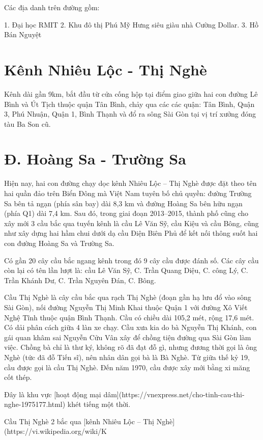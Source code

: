 Các địa danh trên đường gồm:

1. Đại học RMIT
2. Khu đô thị Phú Mỹ Hưng siêu giàu nhà Cường Dollar.
3. Hồ Bán Nguyệt

\section{Kênh Nhiêu Lộc - Thị Nghè}

Kênh dài gần 9km, bắt đầu từ cửa cống hộp tại điểm giao giữa hai con đường Lê Bình và Út Tịch thuộc quận Tân Bình, chảy qua các các quận: Tân Bình, Quận 3, Phú Nhuận, Quận 1, Bình Thạnh và đổ ra sông Sài Gòn tại vị trí xưởng đóng tàu Ba Son cũ.

\section{Đ. Hoàng Sa - Trường Sa}

Hiện nay, hai con đường chạy dọc kênh Nhiêu Lộc – Thị Nghè được đặt theo tên hai quần đảo trên Biển Đông mà Việt Nam tuyên bố chủ quyền: đường Trường Sa bên tả ngạn (phía sân bay) dài 8,3 km và đường Hoàng Sa bên hữu ngạn (phía Q1) dài 7,4 km. Sau đó, trong giai đoạn 2013–2015, thành phố cũng cho xây mới 3 cầu bắc qua tuyến kênh là cầu Lê Văn Sỹ, cầu Kiệu và cầu Bông, cũng như xây dựng hai hầm chui dưới dạ cầu Điện Biên Phủ để kết nối thông suốt hai con đường Hoàng Sa và Trường Sa.

Có gần 20 cây cầu bắc ngang kênh trong đó 9 cây cầu được đánh số. Các cây cầu còn lại có tên lần lượt là: cầu Lê Văn Sỹ, C. Trần Quang Diệu, C. công Lý, C. Trần Khánh Dư, C. Trần Nguyên Đán, C. Bông.

Cầu Thị Nghè là cây cầu bắc qua rạch Thị Nghè (đoạn gần hạ lưu đổ vào sông Sài Gòn), nối đường Nguyễn Thị Minh Khai thuộc Quận 1 với đường Xô Viết Nghệ Tĩnh thuộc quận Bình Thạnh. Cầu có chiều dài 105,2 mét, rộng 17,6 mét. Có dải phân cách giữa 4 làn xe chạy. Cầu xưa kia do bà Nguyễn Thị Khánh, con gái quan khâm sai Nguyễn Cửu Vân xây để chồng tiện đường qua Sài Gòn làm việc. Chồng bà chỉ là thư ký, không rõ đã đạt đỗ gì, nhưng đương thời gọi là ông Nghè (tức đã đỗ Tiến sĩ), nên nhân dân gọi bà là Bà Nghè. Từ giữa thế kỷ 19, cầu được gọi là cầu Thị Nghè. Đến năm 1970, cầu được xây mới bằng xi măng cốt thép.

Đây là khu vực [hoạt động mại dâm](https://vnexpress.net/cho-tinh-cau-thi-nghe-1975177.html) khét tiếng một thời.

Cầu Thị Nghè 2 bắc qua [kênh Nhiêu Lộc – Thị Nghè](https://vi.wikipedia.org/wiki/K%

